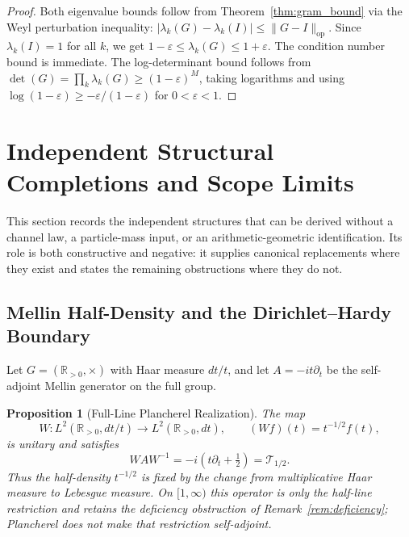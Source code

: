 \documentclass[11pt]{article}
\newtheorem{proposition}[theorem]{Proposition}
\begin{document}
\begin{proof}
Both eigenvalue bounds follow from Theorem~\ref{thm:gram_bound} via the Weyl
perturbation inequality: $|\lambda_k(G) - \lambda_k(I)| \le \|G - I\|_{\mathrm{op}}$.
Since $\lambda_k(I) = 1$ for all $k$, we get $1-\varepsilon \le \lambda_k(G)
\le 1+\varepsilon$.  The condition number bound is immediate.
The log-determinant bound follows from
$\det(G) = \prod_k \lambda_k(G) \ge (1-\varepsilon)^M$, taking logarithms and
using $\log(1-\varepsilon) \ge -\varepsilon/(1-\varepsilon)$ for $0 < \varepsilon < 1$.
\end{proof}

\section{Independent Structural Completions and Scope Limits}
\label{sec:condensed}

This section records the independent structures that can be derived without a
channel law, a particle-mass input, or an arithmetic-geometric identification.
Its role is both constructive and negative: it supplies canonical replacements
where they exist and states the remaining obstructions where they do not.

\subsection{Mellin Half-Density and the Dirichlet--Hardy Boundary}

Let $G=(\mathbb R_{>0},\times)$ with Haar measure $dt/t$, and let
$A=-it\partial_t$ be the self-adjoint Mellin generator on the full group.

\begin{proposition}[Full-Line Plancherel Realization]
\label{prop:plancherel_sa}
The map
\[
  W:L^2(\mathbb R_{>0},dt/t)\longrightarrow L^2(\mathbb R_{>0},dt),
  \qquad (Wf)(t)=t^{-1/2}f(t),
\]
is unitary and satisfies
\[
  WAW^{-1}=-i\left(t\partial_t+\tfrac12\right)=\mathcal T_{1/2}.
\]
Thus the half-density $t^{-1/2}$ is fixed by the change from multiplicative
Haar measure to Lebesgue measure.  On $[1,\infty)$ this operator is only the
half-line restriction and retains the deficiency obstruction of
Remark~\ref{rem:deficiency}; Plancherel does not make that restriction
self-adjoint.
\end{proposition}
\end{document}
